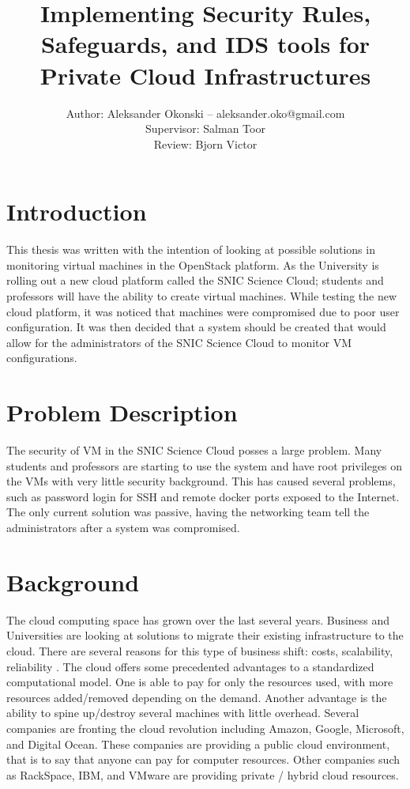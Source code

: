 \documentclass[12pt]{article}
\title{Implementing Security Rules, Safeguards, and IDS tools for Private Cloud Infrastructures}
\author{Author: Aleksander Okonski -- aleksander.oko@gmail.com \\ Supervisor: Salman Toor \\ Review: Bjorn Victor }
\date{}
\begin{document}
\maketitle
\newpage
\tableofcontents
\newpage

\section{Introduction}
This thesis was written with the intention of looking at possible solutions in monitoring virtual machines in the OpenStack platform. As the University is rolling out a new cloud platform called the SNIC Science Cloud; students and professors will have the ability to create virtual machines. While testing the new cloud platform, it was noticed that machines were compromised due to poor user configuration. It was then decided that a system should be created that would allow for the administrators of the SNIC Science Cloud to monitor VM configurations\@.

\section{Problem Description}
The security of VM in the SNIC Science Cloud posses a large problem. Many students and professors are starting to use the system and have root privileges on the VMs with very little security background. This has caused several problems, such as password login for SSH and remote docker ports exposed to the Internet. The only current solution was passive, having the networking team tell the administrators after a system was compromised.

\section{Background}
The cloud computing space has grown over the last several years. Business and Universities are looking at solutions to migrate their existing infrastructure to the cloud. There are several reasons for this type of business shift: costs, scalability, reliability \cite{DillonWuChang}. The cloud offers some precedented advantages to a standardized computational model. One is able to pay for only the resources used, with more resources added/removed depending on the demand. Another advantage is the ability to spine up/destroy several machines with little overhead. Several companies are fronting the cloud revolution including Amazon, Google, Microsoft, and Digital Ocean. These companies are providing a public cloud environment, that is to say that anyone can pay for computer resources. Other companies such as RackSpace, IBM, and VMware are providing private / hybrid cloud resources.
\end{document}
